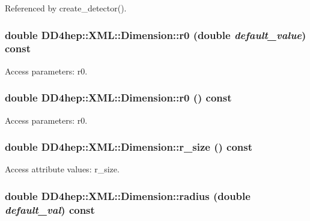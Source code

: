 Referenced by create\_\-detector().\hypertarget{struct_d_d4hep_1_1_x_m_l_1_1_dimension_af075edc02c038dce4043603f9c573632}{
\subsubsection[{r0}]{\setlength{\rightskip}{0pt plus 5cm}double DD4hep::XML::Dimension::r0 (double {\em default\_\-value}) const}}
\label{struct_d_d4hep_1_1_x_m_l_1_1_dimension_af075edc02c038dce4043603f9c573632}


Access parameters: r0. \hypertarget{struct_d_d4hep_1_1_x_m_l_1_1_dimension_a5e63c5a7342680a26da7ea793b7f1c1e}{
\subsubsection[{r0}]{\setlength{\rightskip}{0pt plus 5cm}double DD4hep::XML::Dimension::r0 () const}}
\label{struct_d_d4hep_1_1_x_m_l_1_1_dimension_a5e63c5a7342680a26da7ea793b7f1c1e}


Access parameters: r0. \hypertarget{struct_d_d4hep_1_1_x_m_l_1_1_dimension_a13c400128523f39dbacfd94ff09395bd}{
\subsubsection[{r\_\-size}]{\setlength{\rightskip}{0pt plus 5cm}double DD4hep::XML::Dimension::r\_\-size () const}}
\label{struct_d_d4hep_1_1_x_m_l_1_1_dimension_a13c400128523f39dbacfd94ff09395bd}


Access attribute values: r\_\-size. \hypertarget{struct_d_d4hep_1_1_x_m_l_1_1_dimension_a6d63de717ac5aac8dcdc20b79fd3b87d}{
\subsubsection[{radius}]{\setlength{\rightskip}{0pt plus 5cm}double DD4hep::XML::Dimension::radius (double {\em default\_\-val}) const}}
\label{struct_d_d4hep_1_1_x_m_l_1_1_dimension_a6d63de717ac5aac8dcdc20b79fd3b87d}


